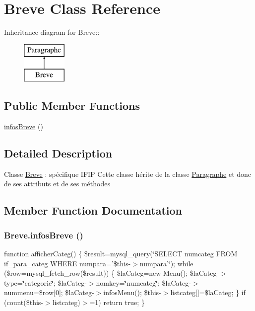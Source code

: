 \hypertarget{class_breve}{
\section{Breve Class Reference}
\label{class_breve}
}
Inheritance diagram for Breve::\begin{figure}[H]
\begin{center}
\leavevmode
\includegraphics[height=2cm]{class_breve}
\end{center}
\end{figure}
\subsection*{Public Member Functions}
\begin{DoxyCompactItemize}
\item 
\hyperlink{class_breve_a804086955fac43d8690803100127814e}{infosBreve} ()
\end{DoxyCompactItemize}


\subsection{Detailed Description}
Classe \hyperlink{class_breve}{Breve} : spécifique IFIP Cette classe hérite de la classe \hyperlink{class_paragraphe}{Paragraphe} et donc de ses attributs et de ses méthodes 

\subsection{Member Function Documentation}
\hypertarget{class_breve_a804086955fac43d8690803100127814e}{
\subsubsection[{infosBreve}]{\setlength{\rightskip}{0pt plus 5cm}Breve.infosBreve ()}}
\label{class_breve_a804086955fac43d8690803100127814e}
function afficherCateg() \{ \$result=mysql\_\-query(\char`\"{}SELECT numcateg FROM if\_\-para\_\-categ WHERE numpara='\$this-\/$>$numpara'\char`\"{}); while (\$row=mysql\_\-fetch\_\-row(\$result)) \{ \$laCateg=new Menu(); \$laCateg-\/$>$type=\char`\"{}categorie\char`\"{}; \$laCateg-\/$>$nomkey=\char`\"{}numcateg\char`\"{}; \$laCateg-\/$>$nummenu=\$row\mbox{[}0\mbox{]}; \$laCateg-\/$>$infosMenu(); \$this-\/$>$listcateg\mbox{[}\mbox{]}=\$laCateg; \} if (count(\$this-\/$>$listcateg)$>$=1) return true; \}


